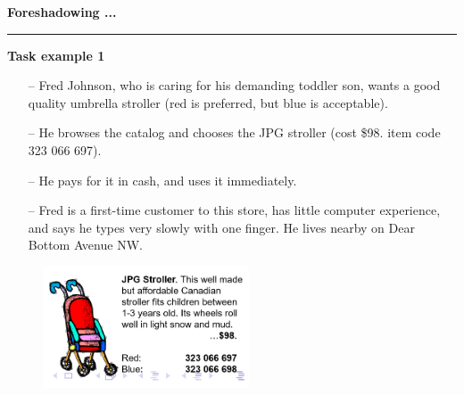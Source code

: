 \documentclass[pdf]{beamer}
\begin{document}
\begin{frame}
\vspace{8mm}
\textcolor{myBlue}{\textbf{\Large{Foreshadowing ...}}}

\textcolor{red}{\rule{10cm}{1mm}}	


     \textbf{Task example 1}
     \bigskip
     \begin{itemize}
        \item[\textcolor{black}{--}] Fred Johnson, who is caring for his demanding toddler son, wants a good quality umbrella stroller (red is preferred, but blue is acceptable). 
        \bigskip
        \item[\textcolor{black}{--}] He browses the catalog and chooses the JPG stroller (cost \$98. item code 323 066 697).
        \bigskip
        \item[\textcolor{black}{--}] He pays for it in cash, and uses it immediately.
        \bigskip
        \item[\textcolor{black}{--}] Fred is a first-time customer to this store, has little computer experience, and says he types very slowly with one finger. He lives nearby on Dear Bottom Avenue NW.


     \end{itemize}
     \begin{figure}[b]
    	\includegraphics[scale = 0.7, right]{8_Picture1.png}
    \end{figure}
\end{frame}
\end{document}
